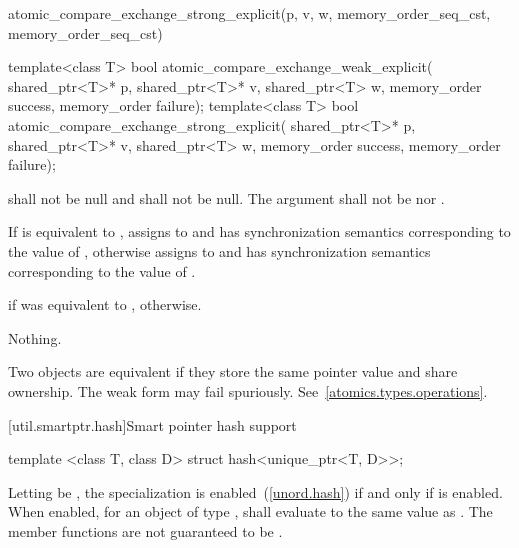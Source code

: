 \begin{itemdescr}
\pnum
\returns
\begin{codeblock}
atomic_compare_exchange_strong_explicit(p, v, w, memory_order_seq_cst, memory_order_seq_cst)
\end{codeblock}
\end{itemdescr}

%
%
\begin{itemdecl}
template<class T>
  bool atomic_compare_exchange_weak_explicit(
    shared_ptr<T>* p, shared_ptr<T>* v, shared_ptr<T> w,
    memory_order success, memory_order failure);
template<class T>
  bool atomic_compare_exchange_strong_explicit(
    shared_ptr<T>* p, shared_ptr<T>* v, shared_ptr<T> w,
    memory_order success, memory_order failure);
\end{itemdecl}

\begin{itemdescr}
\pnum
\requires {} shall not be null and  shall not be null.
The  argument shall not be  nor
.

\pnum
\effects If  is equivalent to , assigns  to
 and has synchronization semantics corresponding to the value of
, otherwise assigns  to  and has
synchronization semantics corresponding to the value of .

\pnum
\returns {} if  was equivalent to ,  otherwise.

\pnum
\throws Nothing.

\pnum
\remarks Two  objects are equivalent if they store the same
pointer value and share ownership.
The weak form may fail spuriously. See~\ref{atomics.types.operations}.
\end{itemdescr}

[util.smartptr.hash]{Smart pointer hash support}

%
\begin{itemdecl}
template <class T, class D> struct hash<unique_ptr<T, D>>;
\end{itemdecl}

\begin{itemdescr}
\pnum
Letting  be ,
the specialization  is enabled~(\ref{unord.hash})
if and only if  is enabled.
When enabled, for an object  of type ,
 shall evaluate to
the same value as .
The member functions are not guaranteed to be .
\end{itemdescr}


